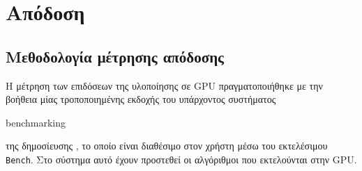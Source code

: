 \DefineShortVerb{\!}
\chapter{Απόδοση}
\section{Μεθοδολογία μέτρησης απόδοσης}
\label{chapter:bench_method}
\noindent
Η μέτρηση των επιδόσεων της υλοποίησης σε GPU πραγματοποιήθηκε με την βοήθεια μίας τροποποιημένης εκδοχής του υπάρχοντος συστήματος \begin{english}benchmarking\end{english} της δημοσίευσης \cite{PlatisTheoharis03}, το οποίο είναι διαθέσιμο στον χρήστη μέσω του εκτελέσιμου \verb!Bench!. Στο σύστημα αυτό έχουν προστεθεί οι αλγόριθμοι που εκτελούνται στην GPU.

